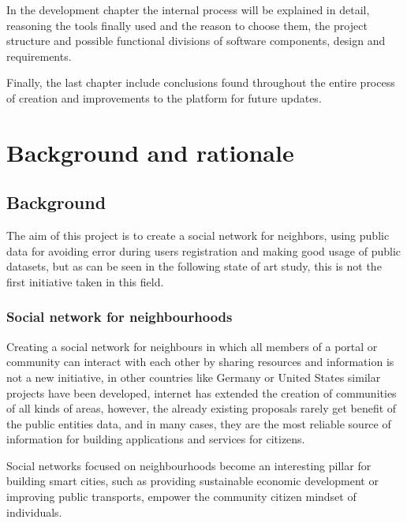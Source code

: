 \documentclass{DeustoFDP}
\begin{document}
In the development chapter the internal process will be explained in detail, reasoning the tools finally used and the reason to choose them, the project structure and possible functional divisions of software components, design and requirements.


Finally, the last chapter include conclusions found throughout the entire process of creation and improvements to the platform for future updates.

\chapter{Background and rationale}\label{cha:backgroundandrationale}
\section{Background}
The aim of this project is to create a social network for neighbors, using public data for avoiding error during users registration and making good usage of public datasets, but as can be seen in the following state of art study, this is not the first initiative taken in this field.
\subsection{Social network for neighbourhoods}
Creating a social network for neighbours in which all members of a portal or community can interact with each other by sharing resources and information is not a new initiative, in other countries like Germany or United States similar projects \cite{larazon} have been developed, internet has extended the creation of communities of all kinds of areas, however, the already existing proposals rarely get benefit of the public entities data, and in many cases, they are the most reliable source of information for building applications and services for citizens.

Social networks focused on neighbourhoods become an interesting pillar for building smart cities, such as providing sustainable economic development or improving public transports, empower the community citizen mindset of individuals.
\end{document}
